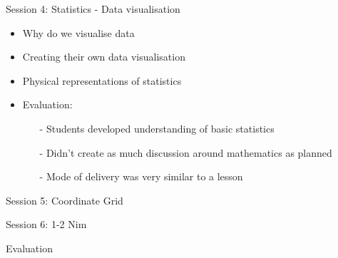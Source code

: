 \documentclass{beamer}  %
\begin{document}
\begin{frame}{Session 4: Statistics - Data visualisation}
    \begin{itemize}
        \item Why do we visualise data
        \item Creating their own data visualisation
        \item Physical representations of statistics
        \pause
        \item Evaluation:
        \begin{itemize}
            \item[-] Students developed understanding of basic statistics
            \item[-] Didn't create as much discussion around mathematics as planned
            \item[-] Mode of delivery was very similar to a lesson 
        \end{itemize}
    \end{itemize}
\end{frame}

\begin{frame}{Session 5: Coordinate Grid}

\end{frame}


\begin{frame}{Session 6: 1-2 Nim}

\end{frame}

\begin{frame}{Evaluation}

\end{frame}
\end{document}
